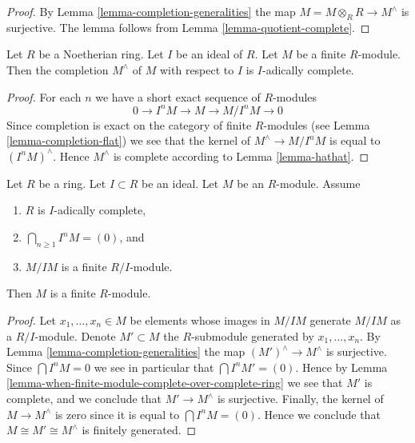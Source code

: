 \begin{proof}
By Lemma \ref{lemma-completion-generalities}
the map $M = M \otimes_R R \to M^\wedge$ is surjective.
The lemma follows from Lemma \ref{lemma-quotient-complete}.
\end{proof}

\begin{lemma}
\label{lemma-completion-complete}
Let $R$ be a Noetherian ring.
Let $I$ be an ideal of $R$.
Let $M$ be a finite $R$-module.
Then the completion $M^\wedge$
of $M$ with respect to $I$ is $I$-adically complete.
\end{lemma}

\begin{proof}
For each $n$ we have a short exact sequence of $R$-modules
$$
0 \to I^nM \to M \to M/I^nM \to 0
$$
Since completion is exact on the category of finite $R$-modules
(see Lemma \ref{lemma-completion-flat})
we see that the kernel of $M^\wedge \to M/I^nM$ is equal to $(I^nM)^\wedge$.
Hence $M^\wedge$ is complete according to Lemma \ref{lemma-hathat}.
\end{proof}

\begin{lemma}
\label{lemma-finite-over-complete-ring}
Let $R$ be a ring. Let $I \subset R$ be an ideal. Let $M$ be an $R$-module.
Assume
\begin{enumerate}
\item $R$ is $I$-adically complete,
\item $\bigcap_{n \geq 1} I^nM = (0)$, and
\item $M/IM$ is a finite $R/I$-module.
\end{enumerate}
Then $M$ is a finite $R$-module.
\end{lemma}

\begin{proof}
Let $x_1, \ldots, x_n \in M$ be elements whose images in $M/IM$ generate
$M/IM$ as a $R/I$-module. Denote $M' \subset M$ the $R$-submodule
generated by $x_1, \ldots, x_n$. By Lemma \ref{lemma-completion-generalities}
the map $(M')^\wedge \to M^\wedge$ is surjective.
Since $\bigcap I^nM = 0$ we see in particular that $\bigcap I^nM' = (0)$.
Hence by Lemma \ref{lemma-when-finite-module-complete-over-complete-ring}
we see that $M'$ is complete, and we conclude that $M' \to M^\wedge$
is surjective. Finally, the kernel of $M \to M^\wedge$ is
zero since it is equal to $\bigcap I^nM = (0)$.
Hence we conclude that $M \cong M' \cong M^\wedge$
is finitely generated.
\end{proof}























